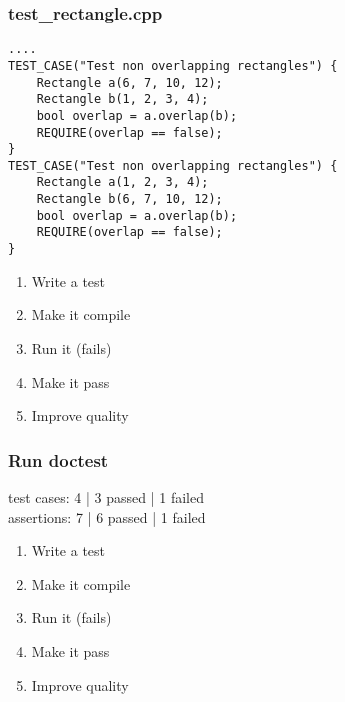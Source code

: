 \begin{frame}[fragile]
\frametitle{test\_rectangle.cpp}
\begin{minipage}[t]{0.48\linewidth}
\begin{lstlisting}
....
TEST_CASE("Test non overlapping rectangles") {
    Rectangle a(6, 7, 10, 12);
    Rectangle b(1, 2, 3, 4);
    bool overlap = a.overlap(b);
    REQUIRE(overlap == false);
}
TEST_CASE("Test non overlapping rectangles") {
    Rectangle a(1, 2, 3, 4);
    Rectangle b(6, 7, 10, 12);
    bool overlap = a.overlap(b);
    REQUIRE(overlap == false);
}
\end{lstlisting}
\end{minipage}\hfill
\begin{minipage}[t]{0.28\linewidth}
  \small
  \begin{enumerate} 
    \item \textcolor{deadcolor}{Write a test}
    \item \textcolor{activecolor}{Make it compile}
    \item \textcolor{deadcolor}{Run it (fails)}
    \item \textcolor{deadcolor}{Make it pass}
    \item \textcolor{deadcolor}{Improve quality}
  \end{enumerate} 
\end{minipage}
\end{frame}


\begin{frame}[fragile]
\frametitle{Run doctest}
\begin{minipage}[t]{0.48\linewidth}
test cases: 4 | 3 passed | 1 failed\\
assertions: 7 | 6 passed | 1 failed\\
\end{minipage}\hfill
\begin{minipage}[t]{0.28\linewidth}
  \small
  \begin{enumerate} 
    \item \textcolor{deadcolor}{Write a test}
    \item \textcolor{deadcolor}{Make it compile}
    \item \textcolor{activecolor}{Run it (fails)}
    \item \textcolor{deadcolor}{Make it pass}
    \item \textcolor{deadcolor}{Improve quality}
  \end{enumerate} 
\end{minipage}
\end{frame}


